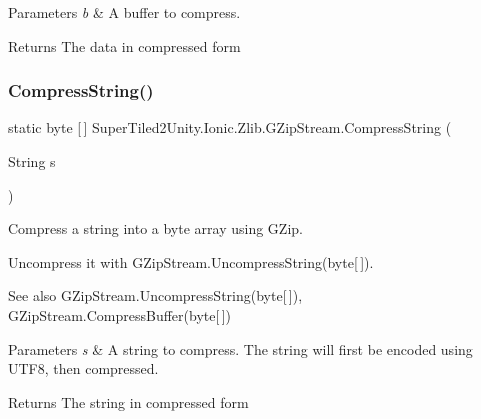 \begin{DoxyParams}{Parameters}
{\em b} & A buffer to compress. \\
\hline
\end{DoxyParams}


\begin{DoxyReturn}{Returns}
The data in compressed form
\end{DoxyReturn}
\mbox{\label{class_super_tiled2_unity_1_1_ionic_1_1_zlib_1_1_g_zip_stream_a9fc4f76be82e1858510a322bcbf33d19}} 
\subsubsection{\texorpdfstring{Compress\+String()}{CompressString()}}
{\footnotesize\ttfamily static byte \mbox{[}$\,$\mbox{]} Super\+Tiled2\+Unity.\+Ionic.\+Zlib.\+G\+Zip\+Stream.\+Compress\+String (\begin{DoxyParamCaption}\item[{String}]{s }\end{DoxyParamCaption})\hspace{0.3cm}{\ttfamily [static]}}



Compress a string into a byte array using G\+Zip. 

Uncompress it with G\+Zip\+Stream.\+Uncompress\+String(byte\mbox{[}$\,$\mbox{]}). 

\begin{DoxySeeAlso}{See also}
G\+Zip\+Stream.\+Uncompress\+String(byte\mbox{[}$\,$\mbox{]}), G\+Zip\+Stream.\+Compress\+Buffer(byte\mbox{[}$\,$\mbox{]})


\end{DoxySeeAlso}



\begin{DoxyParams}{Parameters}
{\em s} & A string to compress. The string will first be encoded using U\+T\+F8, then compressed. \\
\hline
\end{DoxyParams}


\begin{DoxyReturn}{Returns}
The string in compressed form
\end{DoxyReturn}
\mbox{\label{class_super_tiled2_unity_1_1_ionic_1_1_zlib_1_1_g_zip_stream_a43554a520237d8aedb81068572f93507}} 
